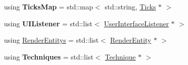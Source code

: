 \begin{DoxyCompactItemize}
\item 
\hypertarget{namespaceEngine_aa2413800e5fc35956d460e08d7c5f9dd}{}using {\bfseries Ticks\+Map} = std\+::map$<$ std\+::string, \hyperlink{structEngine_1_1Ticks}{Ticks} $\ast$ $>$\label{namespaceEngine_aa2413800e5fc35956d460e08d7c5f9dd}

\item 
\hypertarget{namespaceEngine_a1826e0475d309b657b64117d0365f28b}{}using {\bfseries U\+I\+Listener} = std\+::list$<$ \hyperlink{classEngine_1_1UserInterfaceListener}{User\+Interface\+Listener} $\ast$ $>$\label{namespaceEngine_a1826e0475d309b657b64117d0365f28b}

\item 
using \hyperlink{namespaceEngine_a2ca5f163e84c4bc8fe4bd444a3e03a3a}{Render\+Entitys} = std\+::list$<$ \hyperlink{classEngine_1_1RenderEntity}{Render\+Entity} $\ast$ $>$
\item 
\hypertarget{namespaceEngine_aedf966597cb46d096bcc552150de72a1}{}using {\bfseries Techniques} = std\+::list$<$ \hyperlink{classEngine_1_1Technique}{Technique} $\ast$ $>$\label{namespaceEngine_aedf966597cb46d096bcc552150de72a1}

\end{DoxyCompactItemize}
